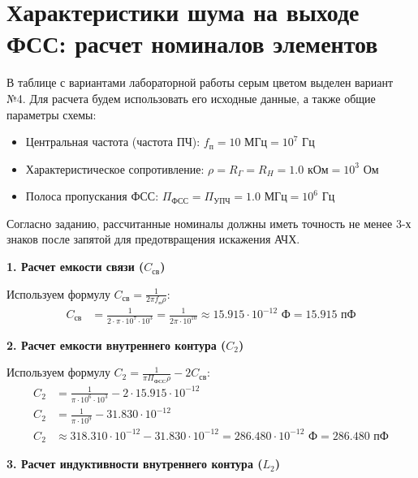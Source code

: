 \section{Характеристики шума на выходе ФСС: расчет номиналов элементов}

В таблице с вариантами лабораторной работы серым цветом выделен вариант №4. Для расчета будем использовать его исходные данные, а также общие параметры схемы:
\begin{itemize}
    \item Центральная частота (частота ПЧ): $f_{\text{п}} = 10 \text{ МГц} = 10^7 \text{ Гц}$
    \item Характеристическое сопротивление: $\rho = R_{\Gamma} = R_H = 1.0 \text{ кОм} = 10^3 \text{ Ом}$
    \item Полоса пропускания ФСС: $\Pi_{\text{ФСС}} = \Pi_{\text{УПЧ}} = 1.0 \text{ МГц} = 10^6 \text{ Гц}$
\end{itemize}

Согласно заданию, рассчитанные номиналы должны иметь точность не менее 3-х знаков после запятой для предотвращения искажения АЧХ.

\vspace{1em}
\textbf{1. Расчет емкости связи ($C_{\text{св}}$)}

Используем формулу $C_{\text{св}} = \frac{1}{2\pi f_{\text{п}} \rho}$:
\begin{align*}
    C_{\text{св}} &= \frac{1}{2 \cdot \pi \cdot 10^7 \cdot 10^3} = \frac{1}{2\pi \cdot 10^{10}} \approx 15.915 \cdot 10^{-12} \text{ Ф} = 15.915 \text{ пФ}
\end{align*}

\vspace{1em}
\textbf{2. Расчет емкости внутреннего контура ($C_2$)}

Используем формулу $C_2 = \frac{1}{\pi \Pi_{\text{ФСС}} \rho} - 2C_{\text{св}}$:
\begin{align*}
    C_2 &= \frac{1}{\pi \cdot 10^6 \cdot 10^3} - 2 \cdot 15.915 \cdot 10^{-12} \\
    C_2 &= \frac{1}{\pi \cdot 10^9} - 31.830 \cdot 10^{-12} \\
    C_2 &\approx 318.310 \cdot 10^{-12} - 31.830 \cdot 10^{-12} = 286.480 \cdot 10^{-12} \text{ Ф} = 286.480 \text{ пФ}
\end{align*}

\vspace{1em}
\textbf{3. Расчет индуктивности внутреннего контура ($L_2$)}

